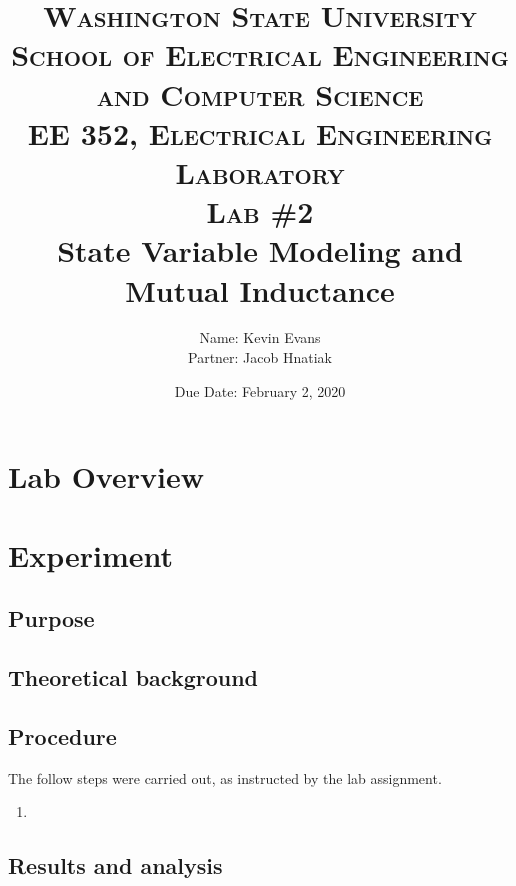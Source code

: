 \documentclass{report}
\title{
	\textsc{ \small
		Washington State University \\
		School of Electrical Engineering and Computer Science \\
		EE 352, Electrical Engineering Laboratory
	} \\
	{\textsc{\small Lab \#2}} \\
	State Variable Modeling and Mutual Inductance
}
\author{
	Name: Kevin Evans \\
	Partner: Jacob Hnatiak
}
\date{Due Date: February 2, 2020}
\begin{document}
\maketitle

\section*{Lab Overview}

\section{Experiment}

\subsection{Purpose}

\subsection{Theoretical background}
\subsection{Procedure}
The follow steps were carried out, as instructed by the lab assignment.
\begin{enumerate}
	\item
\end{enumerate}

\subsection{Results and analysis}
\end{document}
